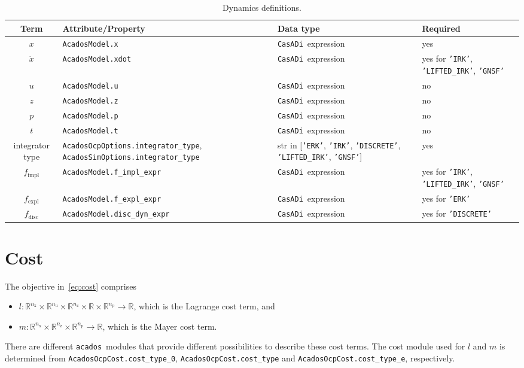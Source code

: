 \documentclass[english]{article}
\newcommand{\code}[1]{\texttt{#1}}
\newcommand{\casadi}{\texttt{CasADi}}
\newcommand{\acados}{\texttt{acados}}
\newcommand{\ind}[1]{_{\textrm{#1}}}
\newcommand{\nx}{n\ind{x}}
\newcommand{\nuu}{n\ind{u}}
\newcommand{\nz}{n\ind{z}}
\newcommand{\np}{n\ind{p}}
\newcommand{\mandatory}{yes}
\newcommand{\optional}{no}
\begin{document}
%
\begin{table}[ht!]
\centering
\begin{tabular}{c@{}C{6.7cm}@{}C{5cm}@{}C{3.4cm}}
\toprule
Term & Attribute/Property & Data type & Required \\ \midrule
$x$ & \code{AcadosModel.x} & \casadi~expression & \mandatory \\[3pt]
$\dot{x}$ & \code{AcadosModel.xdot} & \casadi~expression & \mandatory{} for \code{'IRK'}, \code{'LIFTED\_IRK'}, \code{'GNSF'}  \\[3pt]
$u$ & \code{AcadosModel.u} & \casadi~expression & \optional \\[3pt]
$z$ & \code{AcadosModel.z} & \casadi~expression & \optional \\[3pt]
$p$ & \code{AcadosModel.p} & \casadi~expression & \optional \\[3pt]
$t$ & \code{AcadosModel.t} & \casadi~expression & \optional \\[3pt]
\midrule
integrator type & \code{AcadosOcpOptions.integrator\_type},  \code{AcadosSimOptions.integrator\_type} & str in [\code{'ERK'}, \code{'IRK'}, \code{'DISCRETE'}, \code{'LIFTED\_IRK'}, \code{'GNSF'}] & \mandatory \\[3pt]
\midrule
$ f\ind{impl}$ & \code{AcadosModel.f\_impl\_expr} & \casadi~expression & \mandatory{} for \code{'IRK'}, \code{'LIFTED\_IRK'}, \code{'GNSF'} \\[3pt]
$ f\ind{expl}$ & \code{AcadosModel.f\_expl\_expr} & \casadi~expression & \mandatory{} for \code{'ERK'} \\[3pt]
$f\ind{disc}$ & \code{AcadosModel.disc\_dyn\_expr} & \casadi~expression & \mandatory{} for \code{'DISCRETE'}\\[3pt]
\bottomrule
\end{tabular}
\caption{Dynamics definitions.} \label{tab:dynamics}
\end{table}
%
\section{Cost}\label{sec:cost}
%
The objective in~\eqref{eq:cost} comprises
\begin{itemize}
\item $ l: \mathbb{R}^{\nx}\times\mathbb{R}^{\nuu}\times\mathbb{R}^{\nz}\times\mathbb{R}\times\mathbb{R}^{\np} \rightarrow \mathbb{R}$, which is the Lagrange cost term, and
\item $ m: \mathbb{R}^{\nx}\times\mathbb{R}^{\nz}\times\mathbb{R}^{\np} \rightarrow \mathbb{R}$, which is the Mayer cost term.
\end{itemize}
There are different \acados~modules that provide different possibilities to describe these cost terms.
The cost module used for $l$ and $m$ is determined from \code{AcadosOcpCost.cost\_type\_0}, \code{AcadosOcpCost.cost\_type} and \code{AcadosOcpCost.cost\_type\_e}, respectively.
\end{document}
